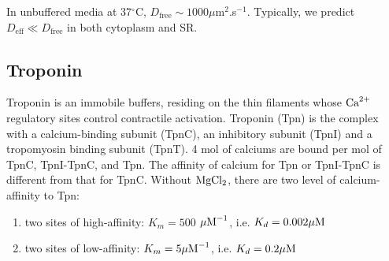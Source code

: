 \begin{framed}
  In unbuffered media at 37$^\circ$C, $D_\text{free}\sim 1000
  \mu$m$^2$.s$^{-1}$. Typically, we predict $D_\text{eff}\ll D_\text{free}$ in
  both cytoplasm and SR. 
\end{framed}









\subsection{Troponin}
\label{sec:troponin}


Troponin is an immobile buffers, residing on the thin filaments whose
${\text{Ca}^{2+}}$ regulatory sites control contractile activation. Troponin (Tpn) is the
complex with a calcium-binding subunit (TpnC), an inhibitory subunit (TpnI) and
a tropomyosin binding subunit (TpnT). 4 mol of calciums are bound per mol of
TpnC, TpnI-TpnC, and Tpn. The affinity of calcium for Tpn or TpnI-TpnC is
different from that for TpnC. Without $\ce{MgCl2}$, there are two level of
calcium-affinity to Tpn:
\begin{enumerate}
  \item two sites of high-affinity: $K_m = 500$ ${\mu\text{M}}^{-1}$, i.e. $K_d=0.002
  {\mu\text{M}}$
  \item two sites of low-affinity: $K_m=5 {\mu\text{M}}^{-1}$, i.e. $K_d=0.2 {\mu\text{M}}$
\end{enumerate}

